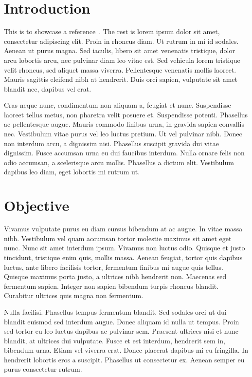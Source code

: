 
\section{Introduction}

This is to showcase a reference~\citep{fowler2001agile}. The rest is lorem ipsum dolor sit amet, consectetur adipiscing elit. Proin in rhoncus diam. Ut rutrum in mi id sodales. Aenean ut purus magna. Sed iaculis, libero sit amet venenatis tristique, dolor arcu lobortis arcu, nec pulvinar diam leo vitae est. Sed vehicula lorem tristique velit rhoncus, sed aliquet massa viverra. Pellentesque venenatis mollis laoreet. Mauris sagittis eleifend nibh at hendrerit. Duis orci sapien, vulputate sit amet blandit nec, dapibus vel erat.

Cras neque nunc, condimentum non aliquam a, feugiat et nunc. Suspendisse laoreet tellus metus, non pharetra velit posuere et. Suspendisse potenti. Phasellus ac pellentesque augue. Mauris commodo finibus urna, in gravida sapien convallis nec. Vestibulum vitae purus vel leo luctus pretium. Ut vel pulvinar nibh. Donec non interdum arcu, a dignissim nisi. Phasellus suscipit gravida dui vitae dignissim. Fusce accumsan urna eu dui faucibus interdum. Nulla ornare felis non odio accumsan, a scelerisque arcu mollis. Phasellus a dictum elit. Vestibulum dapibus leo diam, eget lobortis mi rutrum ut.

\section{Objective}

Vivamus vulputate purus eu diam cursus bibendum at ac augue. In vitae massa nibh. Vestibulum vel quam accumsan tortor molestie maximus sit amet eget nunc. Nunc sit amet interdum ipsum. Vivamus non luctus odio. Quisque et justo tincidunt, tristique enim quis, mollis massa. Aenean feugiat, tortor quis dapibus luctus, ante libero facilisis tortor, fermentum finibus mi augue quis tellus. Quisque maximus porta justo, a ultrices nibh hendrerit non. Maecenas sed fermentum sapien. Integer non sapien bibendum turpis rhoncus blandit. Curabitur ultrices quis magna non fermentum.

Nulla facilisi. Phasellus tempus fermentum blandit. Sed sodales orci ut dui blandit euismod sed interdum augue. Donec aliquam id nulla ut tempus. Proin sed tortor eu leo luctus dapibus ac pulvinar sem. Praesent ultrices nisi et nunc blandit, at ultrices dui vulputate. Fusce et est interdum, hendrerit sem in, bibendum urna. Etiam vel viverra erat. Donec placerat dapibus mi eu fringilla. In hendrerit lobortis eros a suscipit. Phasellus ut consectetur ex. Aenean semper eu purus consectetur rutrum.